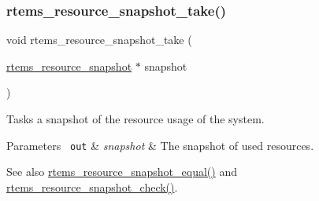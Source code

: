\subsubsection{\texorpdfstring{rtems\_resource\_snapshot\_take()}{rtems\_resource\_snapshot\_take()}}
{\footnotesize\ttfamily void rtems\+\_\+resource\+\_\+snapshot\+\_\+take (\begin{DoxyParamCaption}\item[{\mbox{\hyperlink{structrtems__resource__snapshot}{rtems\+\_\+resource\+\_\+snapshot}} $\ast$}]{snapshot }\end{DoxyParamCaption})}



Tasks a snapshot of the resource usage of the system. 


\begin{DoxyParams}[1]{Parameters}
\mbox{\texttt{ out}}  & {\em snapshot} & The snapshot of used resources.\\
\hline
\end{DoxyParams}
\begin{DoxySeeAlso}{See also}
\mbox{\hyperlink{group__libcsupport_ga09697b55ba33eab04ea841640f393f67}{rtems\+\_\+resource\+\_\+snapshot\+\_\+equal()}} and \mbox{\hyperlink{group__libcsupport_ga3f67474826d25c37ae77d2d129bedf59}{rtems\+\_\+resource\+\_\+snapshot\+\_\+check()}}.
\end{DoxySeeAlso}

\begin{DoxyCode}{0}
\DoxyCodeLine{}
\DoxyCodeLine{}
\DoxyCodeLine{\{}
\DoxyCodeLine{}
\DoxyCodeLine{\}}
\end{DoxyCode}
 